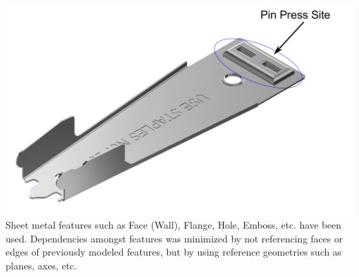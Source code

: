 
\begin{minipage}{\linewidth}
\begin{minipage}[c]{0.62\linewidth}
\includegraphics[width=\linewidth,valign=t]{images/StaplerLower_1_model.pdf}
 \label{fig:results:staplerlowermodel}
Sheet metal features such as Face (Wall), Flange, Hole, Emboss, etc. have been used. Dependencies amongst features was minimized by not referencing faces or edges of previously modeled features, but by using reference geometries such as planes, axes, etc. 
\end{minipage}
\quad
\begin{minipage}[c]{0.3\linewidth}

\end{minipage}
\end{minipage}
